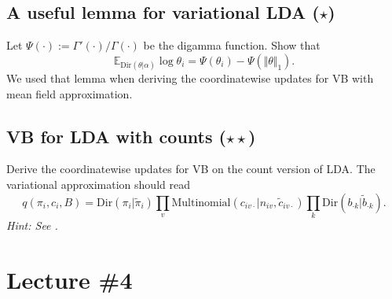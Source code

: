 \documentclass{article}
\begin{document}
\subsection{A useful lemma for variational LDA ($\star$)}
Let $\Psi(\cdot) := \Gamma'(\cdot)/\Gamma(\cdot)$ be the digamma function. Show that
$$
\mathbb{E}_{\text{Dir}(\theta\vert\alpha)} \log \theta_i = \Psi(\theta_i) - \Psi(\Vert \theta\Vert_1).
$$
We used that lemma when deriving the coordinatewise updates for VB with mean field approximation.

\subsection{VB for LDA with counts ($\star\star$)}
Derive the coordinatewise updates for VB on the count version of LDA. The variational approximation should read
$$
q(\pi_i, c_i, B) = \text{Dir}(\pi_i\vert\tilde\pi_i) \prod_v \text{Multinomial}(c_{iv\cdot}\vert n_{iv}, \tilde{c}_{iv\cdot}) \prod_k \text{Dir}(b_{\cdot k}\vert\tilde b_{\cdot k}).
$$
\emph{Hint: See \cite[Section 27.3.6]{Mur12}.}

\section{Lecture \#4}

\printbibliography
\end{document}
